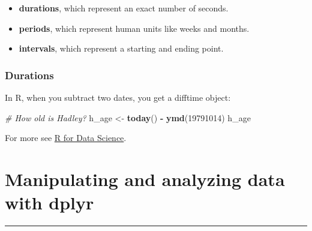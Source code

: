 \documentclass[]{book}
\newenvironment{Shaded}{\begin{snugshade}}{\end{snugshade}}
\newcommand{\KeywordTok}[1]{\textcolor[rgb]{0.13,0.29,0.53}{\textbf{#1}}}
\newcommand{\DecValTok}[1]{\textcolor[rgb]{0.00,0.00,0.81}{#1}}
\newcommand{\StringTok}[1]{\textcolor[rgb]{0.31,0.60,0.02}{#1}}
\newcommand{\CommentTok}[1]{\textcolor[rgb]{0.56,0.35,0.01}{\textit{#1}}}
\newcommand{\OperatorTok}[1]{\textcolor[rgb]{0.81,0.36,0.00}{\textbf{#1}}}
\newcommand{\NormalTok}[1]{#1}
\providecommand{\tightlist}{%
  \setlength{\itemsep}{0pt}\setlength{\parskip}{0pt}}
\begin{document}
\begin{itemize}
\tightlist
\item
  \textbf{durations}, which represent an exact number of seconds.
\item
  \textbf{periods}, which represent human units like weeks and months.
\item
  \textbf{intervals}, which represent a starting and ending point.
\end{itemize}

\subsection{Durations}\label{durations}

In R, when you subtract two dates, you get a difftime object:

\begin{Shaded}
\begin{Highlighting}[]
\CommentTok{# How old is Hadley?}
\NormalTok{h_age <-}\StringTok{ }\KeywordTok{today}\NormalTok{() }\OperatorTok{-}\StringTok{ }\KeywordTok{ymd}\NormalTok{(}\DecValTok{19791014}\NormalTok{)}
\NormalTok{h_age}
\end{Highlighting}
\end{Shaded}

For more see \href{https://r4ds.had.co.nz/dates-and-times.html}{R for
Data Science}.

\chapter{Manipulating and analyzing data with
dplyr}\label{manipulating-and-analyzing-data-with-dplyr}

\begin{center}\rule{0.5\linewidth}{\linethickness}\end{center}
\end{document}
